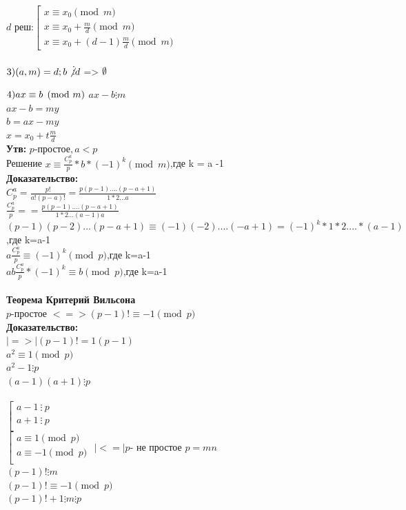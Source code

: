 \documentclass[12pt]{article}
\let\gcd\relax
\DeclareMathOperator{\gcd}{НОД}
\begin{document}
$d \text{ реш:}\left[ \begin{array}{l}
    x \equiv x_0 \pmod{m}               \\
    x \equiv x_0 + \frac{m}{d} \pmod{m} \\
    x \equiv x_0 + (d-1)\frac{m}{d} \pmod{m}
\end{array} \right.
$
    \vspace{0.5cm} %

$3)
\gcd(a, m) = d ; b \not\vdots d $   => $\emptyset  \\$

$4)
    ax \equiv b \pmod{m} \\$
$ax - b \vdots m$\\
$ax - b = my$\\
$b =ax- my$\\
$x=x_0+t\frac{m}{d}$\\

    \textbf{Утв:}
$p$-простое$ , a<p $\\
    Решение  $x\equiv \frac{C_p^a}{p}*b*(-1)^k \pmod{m}$,где k = a -1\\
    \textbf{Доказательство:}\\
$ C_p^a = \frac{p!}{a!(p-a)!}=\frac{p(p-1)....(p-a+1)}{1*2...a} $\\
$\frac{C_p^a}{p}= =\frac{p(p-1)....(p-a+1)}{1*2...(a-1)a}$\\
$(p-1)(p-2)...(p-a+1)\equiv (-1)(-2)....(-a+1) = (-1)^k*1*2....*(a-1)$,где k=a-1\\
$a\frac{C_p^a}{p}\equiv (-1)^k \pmod{p}$,где k=a-1\\
$ab\frac{C_p^a}{p} * (-1)^k\equiv b \pmod{p} $,где k=a-1\\
    \\
    \textbf{Теорема Критерий Вильсона}
    \\
$p$-простое $<=> (p-1)! \equiv -1 \pmod{p} $\\
    \textbf{Доказательство:}\\
$|=>|  (p-1)!= 1(p-1) $\\
$a^2 \equiv 1 \pmod{p}$\\
$a^2 -1 \vdots p$\\
$(a-1)(a+1) \vdots p$\\
    \\
$\left[ \begin{array}{l}
    a-1 \ \vdots\ p \\
    a+1 \ \vdots\ p \\
\end{array} \right.
$
    \\$\left[ \begin{array}{l}
        a \equiv 1 \pmod{p}  \\
        a \equiv -1 \pmod{p} \\
    \end{array} \right.
$
$|<=| p $- не простое $p = mn$\\
$(p-1)!\vdots m $\\
$(p-1)!\equiv -1 \pmod{p}$\\
$(p-1)!+1\vdots m\vdots p $\\
\end{document}
